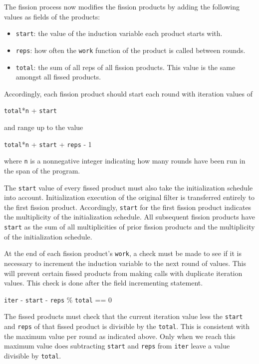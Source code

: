 The fission process now modifies the fission products by adding the
following values as fields of the products:
\begin{itemize}
    \item \texttt{start}: the value of the induction variable each product starts with.
    \item \texttt{reps}: how often the \texttt{work} function of the product is
      called between rounds.
    \item \texttt{total}: the sum of all reps of all fission products. This value is
      the same amongst all fissed products.
\end{itemize}
Accordingly, each fission product should start each round with iteration values
of
\begin{center}
\texttt{total}*\texttt{n} + \texttt{start}
\end{center}
and range up to the value
\begin{center}
\texttt{total}*\texttt{n} + \texttt{start} + \texttt{reps} - 1
\end{center}
where \texttt{n} is a nonnegative integer indicating how many rounds have
been run in the span of the program.  

The \texttt{start} value of every fissed product must also take the initialization schedule into account.  Initialization execution of the original filter is transferred entirely to the first fission product.  Accordingly, \texttt{start} for the first fission product indicates the multiplicity of the initialization schedule.  All subsequent fission products have \texttt{start} as the sum of all multiplicities of prior fission products and the multiplicity of the initialization schedule.

At the end of each fission product's \texttt{work}, a check must be made to see if it is necessary to increment the induction variable to the next round of values.  This will prevent certain fissed products from making calls with duplicate iteration values.  This check is done after the field incrementing statement.
\begin{center}
\texttt{iter} - \texttt{start} - \texttt{reps} \% \texttt{total} == 0
\end{center}
The fissed products must check that the current iteration value less the
\texttt{start} and \texttt{reps} of that fissed product is divisible by the
\texttt{total}.  This is consistent with the maximum value per round as
indicated above.  Only when we reach this maximum value does subtracting 
\texttt{start} and \texttt{reps} from \texttt{iter} leave a value divisible by
\texttt{total}.


